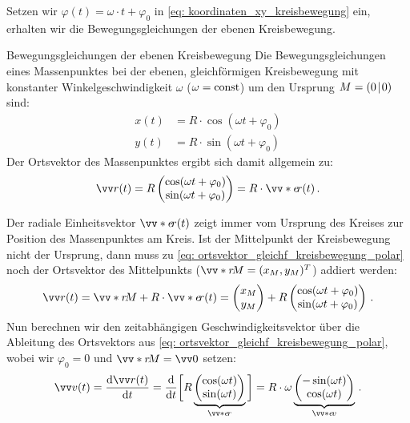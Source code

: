 Setzen wir $\varphi(t) = \omega \cdot t + \varphi_0$ in \cref{eq: koordinaten_xy_kreisbewegung} ein, erhalten wir die Bewegungsgleichungen der ebenen Kreisbewegung. 
\begin{importantbox}{Bewegungsgleichungen der ebenen Kreisbewegung}
    Die Bewegungsgleichungen eines Massenpunktes bei der ebenen, gleichförmigen Kreisbewegung mit konstanter Winkelgeschwindigkeit $\omega$ ($\omega = \mathrm{const}$) um den Ursprung $M=(0\!\mid\! 0)$ sind: 
    \begin{equation}\label{eq: kreisbewegung_xy_polarkoord}\begin{aligned}
        x(t) &= R \cdot \cos(\omega t + \varphi_0)  \\
        y(t) &= R \cdot \sin(\omega t + \varphi_0)
    \end{aligned}\end{equation}
    Der Ortsvektor des Massenpunktes ergibt sich damit allgemein zu: 
    \begin{equation}\label{eq: ortsvektor_gleichf_kreisbewegung_polar}
        \ivec{r}(t) = R \icolTwo{\cos(\omega t + \varphi_0)}{\sin(\omega t + \varphi_0)} = R \cdot \ivecS{e}{r}(t)\mDot
    \end{equation} 
\end{importantbox}
Der radiale Einheitsvektor $\ivecS{e}{r}(t)$ zeigt immer vom Ursprung des Kreises zur Position des Massenpunktes am Kreis. Ist der Mittelpunkt der Kreisbewegung nicht der Ursprung, dann muss zu \cref{eq: ortsvektor_gleichf_kreisbewegung_polar} noch der Ortsvektor des Mittelpunkts ($\ivecS{r}{M} = \inlrowTwo{x_M}{y_M}^\T$) addiert werden: 
\begin{equation}
    \ivec{r}(t) = \ivecS{r}{M} + R\cdot \ivecS{e}{r}(t) = \icolTwo{x_M}{y_M} + R \icolTwo{\cos(\omega t + \varphi_0)}{\sin(\omega t + \varphi_0)} \mDot
\end{equation}
Nun berechnen wir den zeitabhängigen Geschwindigkeitsvektor über die Ableitung des Ortsvektors aus \cref{eq: ortsvektor_gleichf_kreisbewegung_polar}, wobei wir \oBdA $\varphi_0 = 0$ und $\ivecS{r}{M} = \ivec{0}$ setzen: 
\begin{equation}\label{eq: herleitung_geschwvektor_gleichf_kreisbew}
     \ivec{v}(t) = \frac{\dd \ivec{r}(t)}{\dd t} = \frac{\dd}{\dd t} \bigg[ R \underbrace{\icolTwo{\cos(\omega t)}{\sin(\omega t) }}_{\ivecS{e}{r}} \bigg] = R \cdot \omega \underbrace{\icolTwo{-\sin(\omega t)}{\cos(\omega t)}}_{\ivecS{e}{v}} \mDot
\end{equation}
